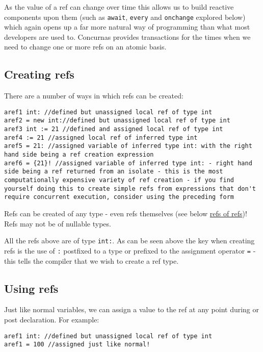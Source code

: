 \documentclass[conc-doc]{subfiles}
\begin{document}
As the value of a ref can change over time this allows us to build reactive components upon them (such as \lstinline{await}, \lstinline{every} and \lstinline{onchange} explored below) which again opens up a far more natural way of programming than what most developers are used to. Concurnas provides transactions for the times when we need to change one or more refs on an atomic basis.

\subsection{Creating refs}
There are a number of ways in which refs can be created:

\begin{lstlisting}
aref1 int: //defined but unassigned local ref of type int
aref2 = new int://defined but unassigned local ref of type int
aref3 int := 21 //defined and assigned local ref of type int
aref4 := 21 //assigned local ref of inferred type int
aref5 = 21: //assigned variable of inferred type int: with the right hand side being a ref creation expression
aref6 = {21}! //assigned variable of inferred type int: - right hand side being a ref returned from an isolate - this is the most computationally expensive variety of ref creation - if you find yourself doing this to create simple refs from expressions that don't require concurrent execution, consider using the preceding form
\end{lstlisting}

Refs can be created of any type - even refs themselves (see below \hyperref[subsec:refofref]{refs of refs})! Refs may not be of nullable types.

All the refs above are of type \lstinline{int:}. As can be seen above the key when creating refs is the use of \lstinline{:} postfixed to a type or prefixed to the assignment operator \lstinline{=} - this tells the compiler that we wish to create a ref type.

\subsection{Using refs}
Just like normal variables, we can assign a value to the ref at any point during or post declaration. For example:

\begin{lstlisting}
aref1 int: //defined but unassigned local ref of type int
aref1 = 100 //assigned just like normal!
\end{lstlisting}
\end{document}

